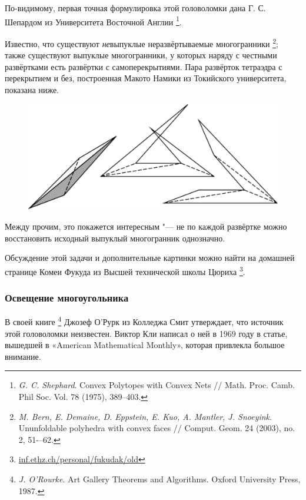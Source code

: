 \documentclass[twoside]{book}
\begin{document}
По-видимому, первая точная формулировка этой головоломки дана Г. С. Шепардом из Университета Восточной Англии%
\footnote{\emph{G. C. Shephard}. Convex Polytopes with Convex Nets /\!/ {Math. Proc. Camb. Phil Soc.} Vol. 78 (1975), 389--403.}.
 
Известно, что существуют \emph{не}выпуклые неразвёртываемые многогранники%
\footnote{\emph{M. Bern, E. Demaine, D. Eppstein, E. Kuo, A. Mantler, J. Snoeyink}. 
  Ununfoldable poly\-hedra with convex faces /\!/
  {Comput. Geom.} 24 (2003), no. 2, 51-–62.};
также существуют выпуклые многогранники, у которых наряду с честными развёртками есть развёртки с самоперекрытиями. 
Пара развёрток тетраэдра с перекрытием и без, построенная Макото Намики из Токийского университета, показана ниже.

\begin{figure}[!ht]
\centering
\includegraphics[scale=0.5]{Figs/UnsolvedPuzzles/unfold}
\end{figure}

Между прочим, это покажется интересным "--- не по каждой развёртке можно восстановить исходный выпуклый многогранник однозначно. %

Обсуждение этой задачи и дополнительные картинки можно найти на домашней странице Комеи Фукуда из Высшей технической школы Цюриха%
\footnote{\href{https://inf.ethz.ch/personal/fukudak/old/}{\url{inf.ethz.ch/personal/fukudak/old}}}.

\subsubsection*{Освещение многоугольника}

В своей книге%
\footnote{\emph{J. O'Rourke}. {Art Gallery Theorems and Algorithms.} Oxford University Press, 1987.}
Джозеф О’Рурк %
из Колледжа Смит утверждает, что источник этой головоломки неизвестен.
Виктор Кли написал о ней в 1969 году в статье, вышедшей в «American Mathe\-ma\-tical Monthly», которая привлекла большое внимание. 
\end{document}

